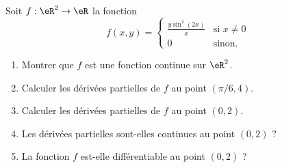 \begin{exercice}\label{exoGeomAnal-0035}

Soit $f: \eR^2\to \eR $ la fonction
\begin{equation}
    f(x,y)=\begin{cases}
        \frac{ y\sin^2(2x) }{ x }    &   \text{si $x\neq 0$}\\
        0    &    \text{sinon.}
    \end{cases}
\end{equation}

  \begin{enumerate}
  \item Montrer que $f$ est une fonction continue sur $\eR^2$.
  \item Calculer les dérivées partielles de $f$ au point $(\pi/6, 4)$.
  \item Calculer les dérivées partielles de $f$ au point $(0,2)$.
  \item Les dérivées partielles sont-elles continues au point $(0,2)$ ?
  \item La fonction $f$ est-elle différentiable au point $(0,2)$ ? 
  \end{enumerate} 

\end{exercice}
